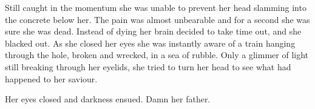 Still caught in the momentum she was unable to prevent her head slamming into the concrete below her.  The pain was almost unbearable and for a second she was sure she was dead.  Instead of dying her brain decided to take time out, and she blacked out.  As she closed her eyes she was instantly aware of a train hanging through the hole, broken and wrecked, in a sea of rubble.  Only a glimmer of light still breaking through her eyelids, she tried to turn her head to see what had happened to her saviour.  

Her eyes closed and darkness ensued.  Damn her father.

